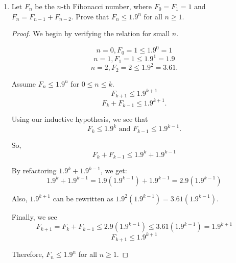 \documentclass{article}
\begin{document}
\begin{enumerate}
{\begin{proof}
            Thus,
            \[9^k = 4m - 5^k + 2\]
            and
            \[5^k = 4m - 9^k + 2.\]

            Then, we see if the relation holds for \(n = k+1\). 
            \[9^{k+1} + 5^{k+1} - 2\]
            \[9(9^k) + 5(5^k) - 2\]
            \[9(4m - 5^k + 2) + 5(4m - 9^k + 2) - 2\]
            \[36m - 9(5^k) + 18 + 20m - 5(9^k) + 10 - 2\]
            \[56m - 9(5^k) + 5(9^k) + 26\]
            \[56m - 45(\frac{5^k}{5} + \frac{9^k}{9}) + 26\]
            \[56m - 45(5^{k-1} + 9^{k-1} - 2) - 2(45) + 26\]
            \[56m - 45(5^{k-1} + 9^{k-1} - 2) - 64\]
            
            Now, we can use our inductive hypothesis to say 
            \(5^{k-1} + 9^{k-1} - 2 = 4m_1\).

            Thus we have 
            \[9^{k+1} + 5^{k+1} - 2 = 56m - 45(4m_1) - 64 = 4(14m - 45m_1 - 16).\]

            Therefore, \(9^n + 5^n - 2\) is divisible by 4 for all \(n \ge 1\).
        \end{proof}
    }

    \item {
        Let \(F_n\) be the \(n\)-th Fibonacci number, where \(F_0 = F_1 = 1\)
        and \(F_n = F_{n-1} + F_{n-2}\). Prove that \(F_n \le 1.9^n\) for all
        \(n \ge 1\).

        \begin{proof}
            We begin by verifying the relation for small \(n\).

            \[n = 0, F_0 = 1 \le 1.9^0 = 1\]
            \[n = 1, F_1 = 1 \le 1.9^1 = 1.9\]
            \[n = 2, F_2 = 2 \le 1.9^2 = 3.61.\]

            Assume \(F_n \le 1.9^n\) for \(0 \le n \le k\).
            \[F_{k+1} \le 1.9^{k+1}\]
            \[F_k + F_{k-1} \le 1.9^{k+1}.\]

            Using our inductive hypothesis, we see that 
            \[F_k \le 1.9^k \text{ and } F_{k-1} \le 1.9^{k-1}.\]

            So,
            \[F_k + F_{k-1} \le 1.9^k + 1.9^{k-1}\] 

            By refactoring \(1.9^k + 1.9^{k-1}\), we get:
            \[1.9^k + 1.9^{k-1} = 1.9(1.9^{k-1}) + 1.9^{k-1} = 2.9(1.9^{k-1})\]

            Also, \(1.9^{k+1}\) can be rewritten as \(1.9^2 (1.9^{k-1}) = 3.61(1.9^{k-1})\).

            Finally, we see
            \[F_{k+1} = F_k + F_{k-1} \le 2.9(1.9^{k-1}) \le 3.61(1.9^{k-1}) = 1.9^{k+1}\]
            \[F_{k+1} \le 1.9^{k+1}\]

            Therefore, \(F_n \le 1.9^n\) for all \(n \ge 1\).
        \end{proof}
    }
\end{enumerate}
\end{document}
